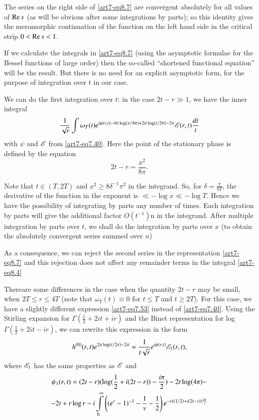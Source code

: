 The series on the right side of \eqref{art7-eq8.7} are convergent absolutely for all values of $\operatorname{Re} s$ (as will be obvious after some integrations by parts); so this identity gives the meromorphic continuation of the function on the left hand side in the critical strip $0< \operatorname{Re} s < 1$.

If we calculate the integrals in \eqref{art7-eq8.7} (using the asymptotic formulae for the Bessel functions of large order) then the so-called ``shortened functional equation'' will be the result. But there is no need for an explicit  asymptotic form, for the purpose of integration over $t$ in our case.

We can do the first integration over $t$: in the case $2t- r \gg 1$, we have the inner integral
\begin{equation}
\frac{1}{\sqrt{r}} \int \omega_T (t) e^{i\psi (r,t) - 4 it \log (x/4\pi) + 2 it \log (t/2 \pi) -2 it} \mathscr{E} (r, t) \frac{dt}{t} \label{art7-eq8.8}
\end{equation}
with $\psi$ and $\mathscr{E}$ from \eqref{art7-eq7.40}. Here the point of the stationary phase is defined by the equation 
\begin{equation}
2t - r = \frac{x^2}{8\pi} . \label{art7-eq8.9}
\end{equation}

Note that $t \in (T, 2T)$ and $x^2 \geqslant 8 \delta^{-1} \pi^2$ in the integrand. So, for $\delta = \frac{\pi}{8 T}$, the derivative of the function in the exponent is $\ll - \log x \ll - \log T$. Hence we have the possibility of integrating by parts any number of times. Each integration by parts will give the additional factor $O(t^{-1})$n in the integrand. After multiple integration by parts over $t$, we shall do the integration by parts over $x$ (to obtain the absolutely convergent series summed over $n$) 

As a consequence, we can reject the second series in the representation \eqref{art7-eq8.7} and this rejection does not affect any remainder terms in the integral \eqref{art7-eq8.4}

There\pageoriginale are some differences in the case when the quantity $2t -r$ may be small, \ie when $2T\leqslant r \leqslant 4 T$ (note that $\omega_T (t) \equiv 0$ for $t \leqslant T$ and $t \geqslant 2T$). For this case, we have a slightly different expression \eqref{art7-eq7.53} instead of \eqref{art7-eq7.40}. Using the Stirling expansion for $\Gamma (\frac{1}{2} + 2 it + ir)$ and the Binet representation for log $\Gamma (\frac{1}{2} + 2 it - ir)$, we can rewrite this expression in the form 
\begin{equation}
h^{(0)} (r,t) e^{2 it \log (t /2 \pi) - 2 it} = \frac{1}{t \sqrt{r}}  e^{i\psi (r,t) } \mathscr{E}_1 (r,t) , \label{art7-eq8.10}
\end{equation}
where $\mathscr{E}_1$ has the same properties as $\mathscr{E}$ and 
\begin{gather}
\psi_1(r,t) = (2t -r) (\log (\frac{1}{2} + i (2t -r)) - \frac{i\pi}{2}) - 2 t \log (4\pi) - \label{art7-eq8.11}\\
- 2 t + r \log r -i \int\limits^\infty_0 \left( (e^v-1)^{-1} - \frac{1}{v} -\frac{1}{2} \right) e^{-v ((1/2) + i (2t -r)) \frac{dv}{v}} \notag
\end{gather}

